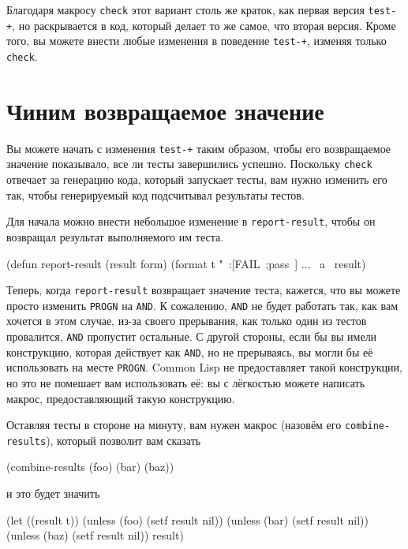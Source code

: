 Благодаря макросу \lstinline{check} этот вариант столь же краток, как первая версия
\lstinline{test-+}, но раскрывается в код, который делает то же самое, что вторая версия. Кроме
того, вы можете внести любые изменения в поведение \lstinline{test-+}, изменяя только
\lstinline{check}.

\section{Чиним возвращаемое значение}

Вы можете начать с изменения \lstinline{test-+} таким образом, чтобы его возвращаемое значение
показывало, все ли тесты завершились успешно. Поскольку \lstinline{check} отвечает за генерацию
кода, который запускает тесты, вам нужно изменить его так, чтобы генерируемый код
подсчитывал результаты тестов.

Для начала можно внести небольшое изменение в \lstinline{report-result}, чтобы он возвращал
результат выполняемого им теста.

\begin{myverb}
(defun report-result (result form)
  (format t "~:[FAIL~;pass~] ... ~a~%
  result)
\end{myverb}

Теперь, когда \lstinline{report-result} возвращает значение теста, кажется, что вы можете
просто изменить \lstinline{PROGN} на \lstinline{AND}. К сожалению, \lstinline{AND} не будет работать так,
как вам хочется в этом случае, из-за своего прерывания, как только один из тестов
провалится, \lstinline{AND} пропустит остальные. С другой стороны, если бы вы имели
конструкцию, которая действует как \lstinline{AND}, но не прерываясь, вы могли бы её
использовать на месте \lstinline{PROGN}. Common Lisp не предоставляет такой конструкции, но это
не помешает вам использовать её: вы с лёгкостью можете написать макрос, предоставляющий
такую конструкцию.

Оставляя тесты в стороне на минуту, вам нужен макрос (назовём его \lstinline{combine-results}),
который позволит вам сказать

\begin{myverb}
(combine-results
  (foo)
  (bar)
  (baz))
\end{myverb}

\noindent{}и это будет значить

\begin{myverb}
(let ((result t))
  (unless (foo) (setf result nil))
  (unless (bar) (setf result nil))
  (unless (baz) (setf result nil))
  result)
\end{myverb}


